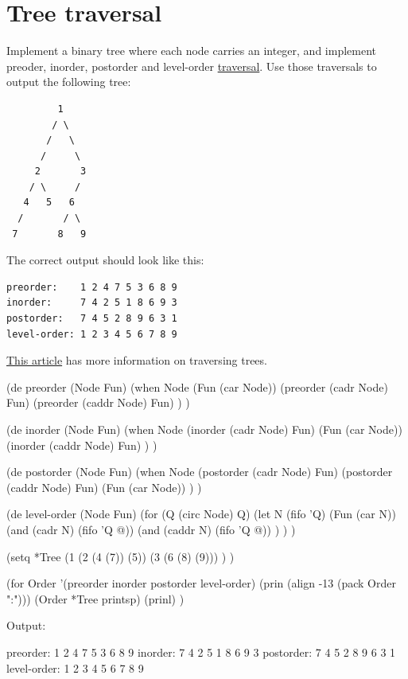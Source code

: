 \pagebreak{}
\section*{Tree traversal}

Implement a binary tree where each node carries an integer, and
implement preoder, inorder, postorder and level-order
\href{http://en.wikipedia.org/wiki/Tree\_traversal}{traversal}. Use
those traversals to output the following tree:

\begin{verbatim}
         1
        / \
       /   \
      /     \
     2       3
    / \     /
   4   5   6
  /       / \
 7       8   9
\end{verbatim}

The correct output should look like this:

\begin{verbatim}
preorder:    1 2 4 7 5 3 6 8 9
inorder:     7 4 2 5 1 8 6 9 3
postorder:   7 4 5 2 8 9 6 3 1
level-order: 1 2 3 4 5 6 7 8 9
\end{verbatim}

\href{http://en.wikipedia.org/wiki/Tree\_traversal}{This article} has
more information on traversing trees.



\begin{wideverbatim}

(de preorder (Node Fun)
   (when Node
      (Fun (car Node))
      (preorder (cadr Node) Fun)
      (preorder (caddr Node) Fun) ) )

(de inorder (Node Fun)
   (when Node
      (inorder (cadr Node) Fun)
      (Fun (car Node))
      (inorder (caddr Node) Fun) ) )

(de postorder (Node Fun)
   (when Node
      (postorder (cadr Node) Fun)
      (postorder (caddr Node) Fun)
      (Fun (car Node)) ) )

(de level-order (Node Fun)
   (for (Q (circ Node)  Q)
      (let N (fifo 'Q)
         (Fun (car N))
         (and (cadr N) (fifo 'Q @))
         (and (caddr N) (fifo 'Q @)) ) ) )

(setq *Tree
   (1
      (2 (4 (7)) (5))
      (3 (6 (8) (9))) ) )

(for Order '(preorder inorder postorder level-order)
   (prin (align -13 (pack Order ":")))
   (Order *Tree printsp)
   (prinl) )

Output:

preorder:    1 2 4 7 5 3 6 8 9
inorder:     7 4 2 5 1 8 6 9 3
postorder:   7 4 5 2 8 9 6 3 1
level-order: 1 2 3 4 5 6 7 8 9

\end{wideverbatim}

